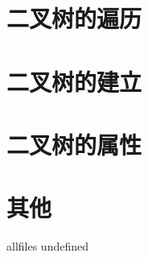 \documentclass{article}
\begin{document}
\begin{CJK}{UTF8}{gbsn}     %

\else
	
\section{二叉树的遍历}

\newpage
\section{二叉树的建立}

\newpage
\section{二叉树的属性}

\newpage
\section{其他}

\newpage

\fi

\ifx allfiles undefined
\end{CJK}
\end{document}
